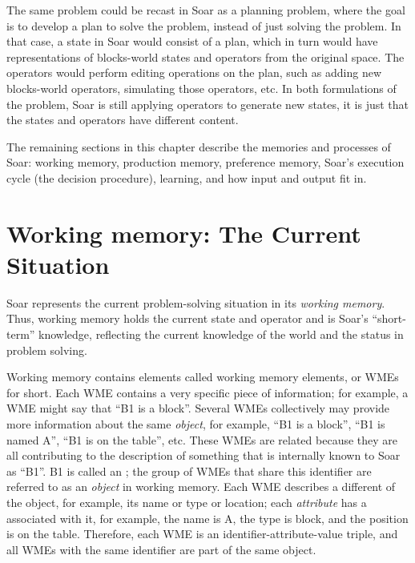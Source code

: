 \begin{figure}
	\label{fig:blocks-ps}
\end{figure}

The same problem could be recast in Soar as a planning problem, where the goal is to develop a plan to solve the problem, instead of just solving the problem.  In that case, a state in Soar would consist of a plan, which in turn would have representations of blocks-world states and operators from the original space.  The operators would perform editing operations on the plan, such as adding new blocks-world operators, simulating those operators, etc.  In both formulations of the problem, Soar is still applying operators to generate new states, it is just that the states and operators have different content.

The remaining sections in this chapter describe the memories and processes of Soar: working memory, production memory, preference memory, Soar's execution cycle (the decision procedure), learning, and how  input and output fit in.


\section{Working memory: The Current Situation} 
\label{ARCH-wm}

Soar represents the current problem-solving situation in its \emph{working memory}. Thus, working memory holds the current state and operator and is Soar's ``short-term'' knowledge, reflecting the current knowledge of the world and the status in problem solving.

Working memory contains elements called working memory elements, or WMEs for short. Each WME contains a very specific piece of information; for example, a WME might say that ``B1 is a block''.  Several WMEs collectively may provide more information about the same \textit{object}, for example, ``B1 is a block'', ``B1 is named A'', ``B1 is on the table'', etc. These WMEs are related because they are all contributing to the description of something that is internally known to Soar as ``B1''. B1 is called an ; the group of WMEs that share this identifier are referred to as an \textit{object} in working memory.  Each WME describes a different  of the object, for example, its name or type or location; each \textit{attribute} has a  associated with it, for example, the name is A, the type is block, and the position is on the table. Therefore, each WME is an identifier-attribute-value triple, and all WMEs with the same identifier are part of the same object. 

